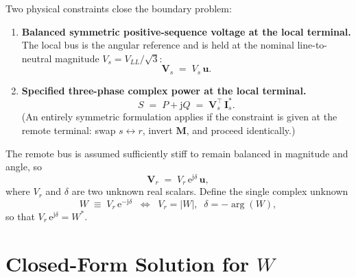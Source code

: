 \documentclass[11pt,a4paper]{article}
\newcommand{\jj}{\mathrm{j}}
\newcommand{\ee}{\mathrm{e}}
\newcommand{\matM}{\bm{M}}
\newcommand{\vV}{\bm{V}}
\newcommand{\vI}{\bm{I}}
\newcommand{\vu}{\bm{u}}
\begin{document}
Two physical constraints close the boundary problem:

\begin{enumerate}
\item \textbf{Balanced symmetric positive-sequence voltage at the local
terminal.} The local bus is the angular reference and is held at the nominal
line-to-neutral magnitude \(V_{s}=V_{LL}/\sqrt{3}\):
\begin{equation}
\vV_{s}\;=\;V_{s}\,\vu.
\label{eq:bc-V}
\end{equation}

\item \textbf{Specified three-phase complex power at the local terminal.}
\begin{equation}
S\;=\;P+\jj Q\;=\;\vV_{s}^{\!\top}\,\vI_{s}^{*}.
\label{eq:bc-S}
\end{equation}
(An entirely symmetric formulation applies if the constraint is given at the
remote terminal: swap \(s\leftrightarrow r\), invert \(\matM\), and proceed
identically.)
\end{enumerate}

The remote bus is assumed sufficiently stiff to remain balanced in magnitude
and angle, so
\begin{equation}
\vV_{r}\;=\;V_{r}\,\ee^{\jj\delta}\,\vu,
\label{eq:Vr-ansatz}
\end{equation}
where \(V_{r}\) and \(\delta\) are two unknown real scalars. Define the
single complex unknown
\begin{equation}
\boxed{\;W\;\equiv\;V_{r}\,\ee^{-\jj\delta}\;\;\Longleftrightarrow\;\;V_{r}=|W|,\;\;\delta=-\arg(W),\;}
\label{eq:W-def}
\end{equation}
so that \(V_{r}\,\ee^{\jj\delta}=W^{*}\).

\section{Closed-Form Solution for \(W\)}
\end{document}
